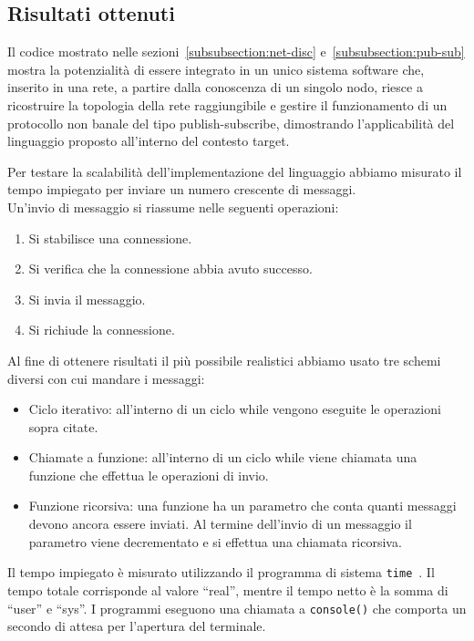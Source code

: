 \documentclass[10pt]{article}
\begin{document}
\subsection{Risultati ottenuti}\label{subsection:risultati}

Il codice mostrato nelle sezioni~\ref{subsubsection:net-disc} e~\ref{subsubsection:pub-sub} mostra la potenzialità di essere integrato in un unico sistema software che, inserito in una rete, a partire dalla conoscenza di un singolo nodo, riesce a ricostruire la topologia della rete raggiungibile e gestire il funzionamento di un protocollo non banale del tipo publish-subscribe, dimostrando l'applicabilità del linguaggio proposto all'interno del contesto target. 

Per testare la scalabilità dell'implementazione del linguaggio abbiamo misurato il tempo impiegato per inviare un numero crescente di messaggi.\\
Un'invio di messaggio si riassume nelle seguenti operazioni:
\begin{enumerate}
	\item Si stabilisce una connessione.
	\item{Si verifica che la connessione abbia avuto successo.}
	\item Si invia il messaggio. 
	\item Si richiude la connessione.
\end{enumerate}

Al fine di ottenere risultati il più possibile realistici abbiamo usato tre schemi diversi con cui mandare i messaggi:
\begin{itemize}
	\item Ciclo iterativo: all'interno di un ciclo while vengono eseguite le operazioni sopra citate.
	\item Chiamate a funzione: all'interno di un ciclo while viene chiamata una funzione che effettua le operazioni di invio.
	\item Funzione ricorsiva: una funzione ha un parametro che conta quanti messaggi devono ancora essere inviati. Al termine dell'invio di un messaggio il parametro viene decrementato e si effettua una chiamata ricorsiva.
\end{itemize}

Il tempo impiegato è misurato utilizzando il programma di sistema \texttt{time}~\cite{time1linux}. Il tempo totale corrisponde al valore ``real'', mentre il tempo netto è la somma di ``user'' e ``sys''. I programmi eseguono una chiamata a \texttt{console()} che comporta un secondo di attesa per l'apertura del terminale.
\end{document}

